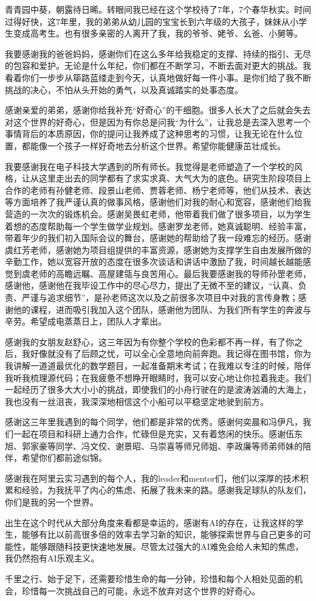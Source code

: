 

青青园中葵，朝露待日晞。转眼间我已经在这个学校待了7年，7个春华秋实。时间过得好快，这7年里，我的弟弟从幼儿园的宝宝长到六年级的大孩子，妹妹从小学生变成高考生。也有很多亲密的人离开了我，我的爷爷、姥爷、幺爸、小舅等。

我要感谢我的爸爸妈妈，感谢你们在这么多年给我稳定的支撑、持续的指引、无尽的包容和爱护。无论是什么年纪，你们都在不断学习，不断去面对更大的挑战。我看着你们一步步从筚路蓝缕走到今天，认真地做好每一件小事。是你们给了我不断挑战的决心，不怕从头开始的勇气，以及真诚踏实的处事态度。

感谢亲爱的弟弟，感谢你给我补充“好奇心”的干细胞。很多人长大了之后就会失去对这个世界的好奇心，但是因为有你总是问我“为什么”，让我总是去深入思考一个事情背后的本质原因，你的提问让我养成了这种思考的习惯，让我无论在什么位置，都能像一个孩子一样好奇地去分析这个世界。希望你能健康茁壮成长。

我要感谢我在电子科技大学遇到的所有师长。我觉得是老师塑造了一个学校的风格，让从这里走出去的同学都有了求实求真、大气大为的底色。研究生阶段项目上合作的老师有孙健老师、段景山老师、贾蓉老师、杨宁老师等，他们从技术、表达等方面培养了我严谨认真的做事风格，感谢他们对我的耐心和宽容，感谢他们给我营造的一次次的锻炼机会。感谢吴畏虹老师，他带着我们做了很多项目，以为学生着想的态度帮助每一个学生做学业规划。感谢罗龙老师，她真诚聪明、经验丰富，带着年少的我们初入国际会议的舞台，感谢她的帮助给了我一段难忘的经历。感谢虞红芳老师，感谢她为项目组提供的丰富资源，感谢她为支撑学生自由发展所做的辛勤工作，她以宽容开放的态度在很多次谈话和讲话中激励了我，时间越长越能感觉到虞老师的高瞻远瞩、高屋建瓴与良苦用心。最后我要感谢我的导师孙罡老师，感谢他，感谢他在我毕设工作中的尽心尽力，提出了无微不至的建议，“认真、负责、严谨与追求细节”，是孙老师这次以及之前很多次项目中对我的言传身教；感谢他的课程，进而吸引我加入这个团队，感谢他为团队、为我们所有学生的奔波与辛劳。希望成电蒸蒸日上，团队人才辈出。

感谢我的女朋友赵舒心，这三年因为有你整个学校的色彩都不再一样，有了你之后，我好像就没有了后顾之忧，可以全心全意地向前奔跑。我记得在图书馆，你为我讲解一道道最优化的数学题目，一起准备期末考试；在我难以专注的时候，陪伴我听我梳理源代码；在我疲惫不想睁开眼睛时，我可以安心地让你拉着我走。我们一起经历了很多大大小小的挑战，即使我们的小舟行驶在的是波涛汹涌的大海上，我也没有一丝沮丧，我深深地相信这个小船可以平稳坚定地驶到前方。

感谢这三年里我遇到的每个同学，他们都是非常的优秀。感谢何奕晨和冯伊凡，我们一起在项目和科研上通力合作，忙碌但是充实，又有着悠闲的快乐。感谢伍东旭、郭家豪等同学、冯文佼、谢景昭、马崇喜等师兄师姐、李政廉等师弟师妹的陪伴，希望你们都前途似锦。

感谢我在阿里云实习遇到的每个人，我的leader和mentor们，他们以深厚的技术积累和经验，为我抚平了内心的焦虑、拓展了我未来的路。感谢我足球队的队友们，你们是我的另一个世界。

出生在这个时代从大部分角度来看都是幸运的，感谢有AI的存在，让我这样的学生，能够有比以前高很多倍的效率去学习新的知识，能够探索世界与自己更多的可能性，能够跟随科技更快速地发展。尽管太过强大的AI难免会给人未知的焦虑，我仍然抱有AI乐观主义。

千里之行、始于足下，还需要珍惜生命的每一分钟，珍惜和每个人相处见面的机会，珍惜每一次挑战自己的可能，永远不放弃对这个世界的好奇心。